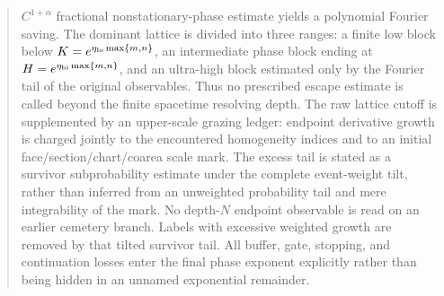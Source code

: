 \documentclass[11pt]{article}
\begin{document}
\begin{abstract}
$C^{1+\alpha}$ fractional nonstationary-phase estimate yields a polynomial
Fourier saving.  The dominant lattice is divided into three ranges: a finite
low block below $K=e^{\eta_{\rm lo}\max\{m,n\}}$, an intermediate phase block
ending at $H=e^{\eta_{\rm hi}\max\{m,n\}}$, and an ultra-high block estimated
only by the Fourier tail of the original observables.  Thus no prescribed
escape estimate is called beyond the finite spacetime resolving depth.  The
raw lattice cutoff is supplemented by an upper-scale grazing ledger: endpoint
derivative growth is charged jointly to the encountered homogeneity indices
and to an initial face/section/chart/coarea scale mark.  The excess tail is
stated as a survivor subprobability estimate under the complete event-weight
tilt, rather than inferred from an unweighted probability tail and mere
integrability of the mark.  No depth-$N$ endpoint observable is read on an
earlier cemetery branch.  Labels with excessive weighted growth are removed
by that tilted survivor tail.  All
buffer, gate, stopping, and continuation losses enter the final phase exponent
explicitly rather than being hidden in an unnamed exponential remainder.


\end{abstract}
\end{document}
